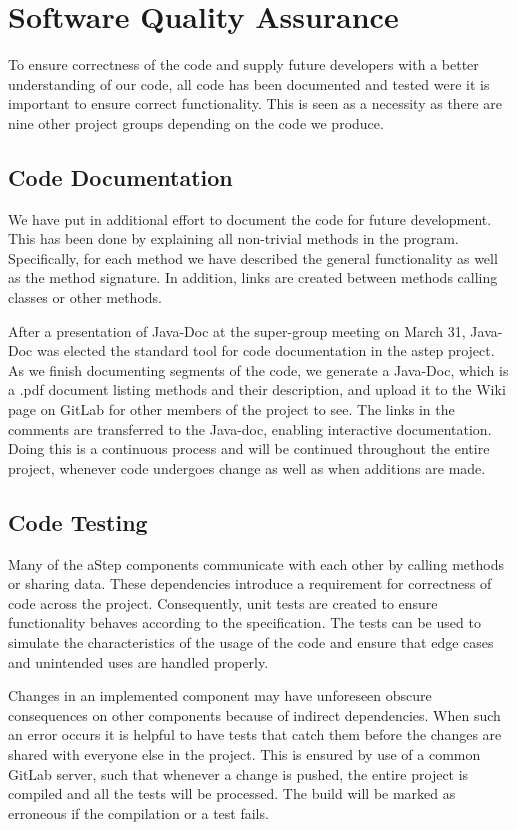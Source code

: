 \section{Software Quality Assurance}\label{sec:unit_test}
To ensure correctness of the code and supply future developers with a better understanding of our code, all code has been documented and tested were it is important to ensure correct functionality. This is seen as a necessity as there are nine other project groups depending on the code we produce.

\subsection{Code Documentation} \label{sec:code_documentation}
We have put in additional effort to document the code for future development. This has been done by explaining all non-trivial methods in the program. Specifically, for each method we have described the general functionality as well as the method signature. In addition, links are created between methods calling classes or other methods. 

After a presentation of Java-Doc at the super-group meeting on March 31, Java-Doc was elected the standard tool for code documentation in the astep project.
As we finish documenting segments of the code, we generate a Java-Doc, which is a .pdf document listing methods and their description, and upload it to the Wiki page on GitLab for other members of the project to see. The links in the comments are transferred to the Java-doc, enabling interactive documentation. 
Doing this is a continuous process and will be continued throughout the entire project, whenever code undergoes change as well as when additions are made.


\subsection{Code Testing}
Many of the aStep components communicate with each other by calling methods or sharing data. These dependencies introduce a requirement for correctness of code across the project. Consequently, unit tests are created to ensure functionality behaves according to the specification. The tests can be used to simulate the characteristics of the usage of the code and ensure that edge cases and unintended uses are handled properly. 

Changes in an implemented component may have unforeseen obscure consequences on other components because of indirect dependencies. When such an error occurs it is helpful to have tests that catch them before the changes are shared with everyone else in the project. This is ensured by use of a common GitLab server, such that whenever a change is pushed, the entire project is compiled and all the tests will be processed. The build will be marked as erroneous if the compilation or a test fails.


